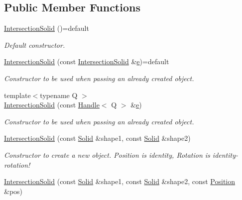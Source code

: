 \subsection*{Public Member Functions}
\begin{DoxyCompactItemize}
\item 
\hyperlink{class_d_d4hep_1_1_geometry_1_1_intersection_solid_a25668c54b50ea91e0728456ad7a17202}{Intersection\+Solid} ()=default
\begin{DoxyCompactList}\small\item\em Default constructor. \end{DoxyCompactList}\item 
\hyperlink{class_d_d4hep_1_1_geometry_1_1_intersection_solid_ae3a92433f26bea43a8064c233397e115}{Intersection\+Solid} (const \hyperlink{class_d_d4hep_1_1_geometry_1_1_intersection_solid}{Intersection\+Solid} \&\hyperlink{_volumes_8cpp_a8a9a1f93e9b09afccaec215310e64142}{e})=default
\begin{DoxyCompactList}\small\item\em Constructor to be used when passing an already created object. \end{DoxyCompactList}\item 
{\footnotesize template$<$typename Q $>$ }\\\hyperlink{class_d_d4hep_1_1_geometry_1_1_intersection_solid_a0b463061fde40c2e90a7d135305b6421}{Intersection\+Solid} (const \hyperlink{class_d_d4hep_1_1_handle}{Handle}$<$ Q $>$ \&\hyperlink{_volumes_8cpp_a8a9a1f93e9b09afccaec215310e64142}{e})
\begin{DoxyCompactList}\small\item\em Constructor to be used when passing an already created object. \end{DoxyCompactList}\item 
\hyperlink{class_d_d4hep_1_1_geometry_1_1_intersection_solid_a87844b8aab46a41e8b1a94e06c7ea88b}{Intersection\+Solid} (const \hyperlink{namespace_d_d4hep_1_1_geometry_a83de90a8dcc7378ba47d54ef9a6a687b}{Solid} \&shape1, const \hyperlink{namespace_d_d4hep_1_1_geometry_a83de90a8dcc7378ba47d54ef9a6a687b}{Solid} \&shape2)
\begin{DoxyCompactList}\small\item\em Constructor to create a new object. Position is identity, Rotation is identity-\/rotation! \end{DoxyCompactList}\item 
\hyperlink{class_d_d4hep_1_1_geometry_1_1_intersection_solid_a4b62f2ea208c14e2d2ea4006bce4cc67}{Intersection\+Solid} (const \hyperlink{namespace_d_d4hep_1_1_geometry_a83de90a8dcc7378ba47d54ef9a6a687b}{Solid} \&shape1, const \hyperlink{namespace_d_d4hep_1_1_geometry_a83de90a8dcc7378ba47d54ef9a6a687b}{Solid} \&shape2, const \hyperlink{namespace_d_d4hep_1_1_geometry_a55083902099d03506c6db01b80404900}{Position} \&pos)

\end{DoxyCompactItemize}
